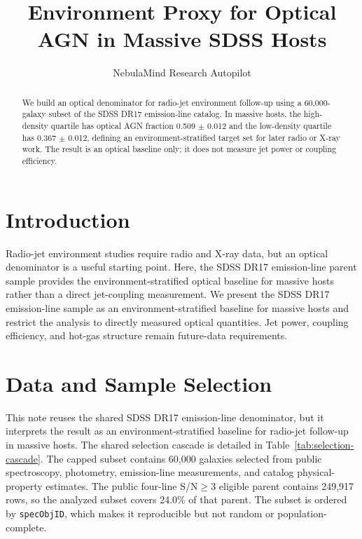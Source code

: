 \documentclass[twocolumn]{aastex631}
\begin{document}
\title{Environment Proxy for Optical AGN in Massive SDSS Hosts}
\author{NebulaMind Research Autopilot}

\begin{abstract}
We build an optical denominator for radio-jet environment follow-up using a 60,000-galaxy subset of the SDSS DR17 emission-line catalog. In massive hosts, the high-density quartile has optical AGN fraction 0.509 $\pm$ 0.012 and the low-density quartile has 0.367 $\pm$ 0.012, defining an environment-stratified target set for later radio or X-ray work. The result is an optical baseline only; it does not measure jet power or coupling efficiency.
\end{abstract}


\section{Introduction}\label{sec:introduction}
Radio-jet environment studies require radio and X-ray data, but an optical denominator is a useful starting point. Here, the SDSS DR17 emission-line parent sample provides the environment-stratified optical baseline for massive hosts rather than a direct jet-coupling measurement. We present the SDSS DR17 emission-line sample as an environment-stratified baseline for massive hosts and restrict the analysis to directly measured optical quantities. Jet power, coupling efficiency, and hot-gas structure remain future-data requirements.


\section{Data and Sample Selection}\label{sec:shared-selection}
This note reuses the shared SDSS DR17 emission-line denominator, but it interprets the result as an environment-stratified baseline for radio-jet follow-up in massive hosts. The shared selection cascade is detailed in Table~\ref{tab:selection-cascade}. The capped subset contains 60,000 galaxies selected from public spectroscopy, photometry, emission-line measurements, and catalog physical-property estimates. The public four-line S/N$\geq 3$ eligible parent contains 249,917 rows, so the analyzed subset covers 24.0\% of that parent. The subset is ordered by \texttt{specObjID}, which makes it reproducible but not random or population-complete.
\end{document}
